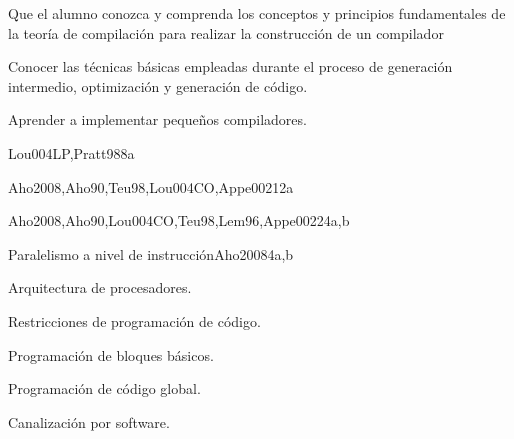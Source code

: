 \begin{syllabus}


\begin{justification}
Que el alumno conozca y comprenda los conceptos y principios
fundamentales de la teoría de compilación para realizar la
construcción de un compilador
\end{justification}

\begin{goals}
\item Conocer las técnicas básicas empleadas durante el proceso de generación intermedio, optimización y generación de código.
\item Aprender a implementar pequeños compiladores.
\end{goals}

\begin{outcomes}
\end{outcomes}

\begin{unit}{\PLOverviewDef}{}{Lou004LP,Pratt98}{8}{a}
   \PLOverviewAllTopics
   \PLOverviewAllObjectives
\end{unit}

\begin{unit}{\PLBasicLanguageTranslationDef}{}{Aho2008,Aho90,Teu98,Lou004CO,Appe002}{12}{a}
   \PLBasicLanguageTranslationAllTopics
   \PLBasicLanguageTranslationAllObjectives
\end{unit}

\begin{unit}{\PLLanguageTranslatioSystemsDef}{}{Aho2008,Aho90,Lou004CO,Teu98,Lem96,Appe002}{24}{a,b}
   \PLLanguageTranslatioSystemsAllTopics
   \PLLanguageTranslatioSystemsAllObjectives
\end{unit}

\begin{unit}{Paralelismo a nivel de instrucción}{}{Aho2008}{4}{a,b}
  \begin{topics}
     \item Arquitectura de procesadores.
     \item Restricciones de programación de código.
     \item Programación de bloques básicos.
     \item Programación de código global.
     \item Canalización por software.
  \end{topics}


\end{unit}
\end{syllabus}
